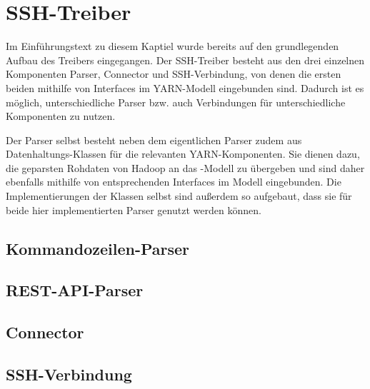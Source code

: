 \section{SSH-Treiber}\label{sec:sshDriver}

Im Einführungstext zu diesem Kaptiel wurde bereits auf den grundlegenden Aufbau des Treibers eingegangen. Der SSH-Treiber besteht aus den drei einzelnen Komponenten Parser, Connector und SSH-Verbindung, von denen die ersten beiden mithilfe von Interfaces im YARN-Modell eingebunden sind. Dadurch ist es möglich, unterschiedliche Parser bzw. auch Verbindungen für unterschiedliche Komponenten zu nutzen.

Der Parser selbst besteht neben dem eigentlichen Parser zudem aus Datenhaltungs-Klassen für die relevanten YARN-Komponenten. Sie dienen dazu, die geparsten Rohdaten von Hadoop an das \sS-Modell zu übergeben und sind daher ebenfalls mithilfe von entsprechenden Interfaces im Modell eingebunden. Die Implementierungen der Klassen selbst sind außerdem so aufgebaut, dass sie für beide hier implementierten Parser genutzt werden können.

\subsection{Kommandozeilen-Parser}\label{sec:cmdParser}


\subsection{REST-API-Parser}\label{sec:restParser}


\subsection{Connector}\label{sec:Connector}


\subsection{SSH-Verbindung}\label{sec:sshConnection}

